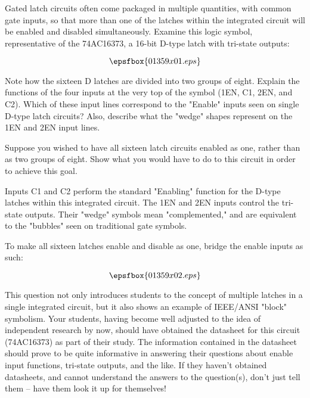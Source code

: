 

Gated latch circuits often come packaged in multiple quantities, with common gate inputs, so that more than one of the latches within the integrated circuit will be enabled and disabled simultaneously.  Examine this logic symbol, representative of the 74AC16373, a 16-bit D-type latch with tri-state outputs:

$$\epsfbox{01359x01.eps}$$

Note how the sixteen D latches are divided into two groups of eight.  Explain the functions of the four inputs at the very top of the symbol (1EN, C1, 2EN, and C2).  Which of these input lines correspond to the "Enable" inputs seen on single D-type latch circuits?  Also, describe what the "wedge" shapes represent on the 1EN and 2EN input lines.

Suppose you wished to have all sixteen latch circuits enabled as one, rather than as two groups of eight.  Show what you would have to do to this circuit in order to achieve this goal.







Inputs C1 and C2 perform the standard "Enabling" function for the D-type latches within this integrated circuit.  The 1EN and 2EN inputs control the tri-state outputs.  Their "wedge" symbols mean "complemented," and are equivalent to the "bubbles" seen on traditional gate symbols.

\vskip 10pt

To make all sixteen latches enable and disable as one, bridge the enable inputs as such:

$$\epsfbox{01359x02.eps}$$







This question not only introduces students to the concept of multiple latches in a single integrated circuit, but it also shows an example of IEEE/ANSI "block" symbolism.  Your students, having become well adjusted to the idea of independent research by now, should have obtained the datasheet for this circuit (74AC16373) as part of their study.  The information contained in the datasheet should prove to be quite informative in answering their questions about enable input functions, tri-state outputs, and the like.  If they haven't obtained datasheets, and cannot understand the answers to the question(s), don't just tell them -- have them look it up for themselves!




